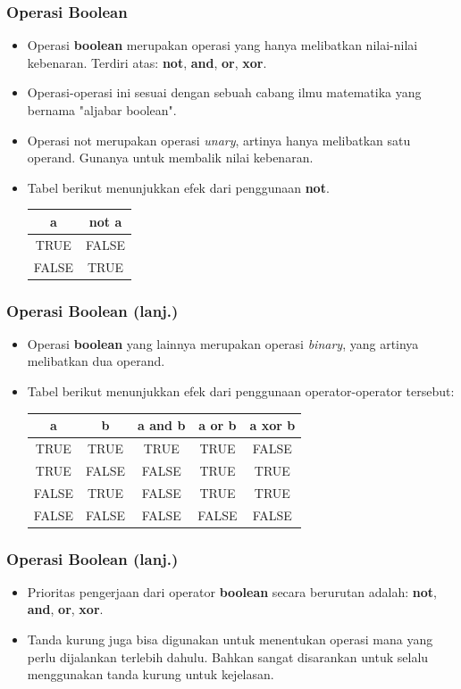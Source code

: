 \begin{frame}
\frametitle{Operasi Boolean}
\begin{itemize}
  \item Operasi \textbf{boolean} merupakan operasi yang hanya melibatkan nilai-nilai kebenaran. Terdiri atas: \textbf{not}, \textbf{and}, \textbf{or}, \textbf{xor}.
  \item Operasi-operasi ini sesuai dengan sebuah cabang ilmu matematika yang bernama "aljabar boolean".
  \item Operasi \alert{not} merupakan operasi \textit{unary}, artinya hanya melibatkan satu operand. Gunanya untuk membalik nilai kebenaran.
  \item Tabel berikut menunjukkan efek dari penggunaan \textbf{not}.
  \begin{tabular}{|c|c|}
  \hline a & not a \\
  \hline TRUE & FALSE \\
  \hline FALSE & TRUE \\
  \hline
  \end{tabular}
\end{itemize}
\end{frame}

\begin{frame}
\frametitle{Operasi Boolean (lanj.)}
\begin{itemize}
  \item Operasi \textbf{boolean} yang lainnya merupakan operasi \textit{binary}, yang artinya melibatkan dua operand.
  \item Tabel berikut menunjukkan efek dari penggunaan operator-operator tersebut:
  \begin{tabular}{|c|c|c|c|c|}
  \hline a & b & a and b & a or b & a xor b \\
  \hline TRUE & TRUE & TRUE & TRUE & FALSE \\
  \hline TRUE & FALSE & FALSE & TRUE & TRUE \\
  \hline FALSE & TRUE & FALSE & TRUE & TRUE\\
  \hline FALSE & FALSE & FALSE & FALSE & FALSE \\
  \hline
  \end{tabular}
\end{itemize}
\end{frame}

\begin{frame}
\frametitle{Operasi Boolean (lanj.)}
\begin{itemize}
  \item Prioritas pengerjaan dari operator \textbf{boolean} secara berurutan adalah: \textbf{not}, \textbf{and}, \textbf{or}, \textbf{xor}.
  \item Tanda kurung juga bisa digunakan untuk menentukan operasi mana yang perlu dijalankan terlebih dahulu. Bahkan sangat disarankan untuk selalu menggunakan tanda kurung untuk kejelasan.
\end{itemize}
\end{frame}

